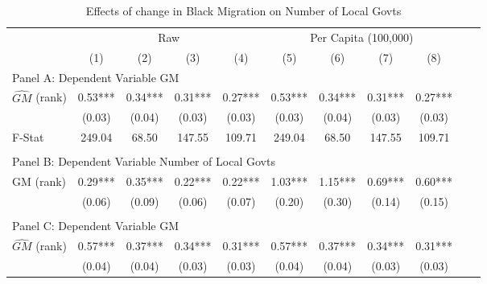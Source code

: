  \begin{table}[htbp]\centering {} \begin{threeparttable} \caption{Effects of change in Black Migration on Number of Local Govts} \begin{tabular}{l*{10}{c}} \toprule
                &\multicolumn{4}{c}{Raw}                                    &\multicolumn{4}{c}{Per Capita (100,000)}                   \\\cmidrule(lr){2-5}\cmidrule(lr){6-9}
                &\multicolumn{1}{c}{(1)}   &\multicolumn{1}{c}{(2)}   &\multicolumn{1}{c}{(3)}   &\multicolumn{1}{c}{(4)}   &\multicolumn{1}{c}{(5)}   &\multicolumn{1}{c}{(6)}   &\multicolumn{1}{c}{(7)}   &\multicolumn{1}{c}{(8)}   \\
\cmidrule(lr){1-9}
\multicolumn{8}{l}{Panel A: Dependent Variable GM}\\
\cmidrule(lr){1-9}
$\hat{GM}$ (rank)&       0.53***&       0.34***&       0.31***&       0.27***&       0.53***&       0.34***&       0.31***&       0.27***\\
                &     (0.03)   &     (0.04)   &     (0.03)   &     (0.03)   &     (0.03)   &     (0.04)   &     (0.03)   &     (0.03)   \\
\midrule
F-Stat          &     249.04   &      68.50   &     147.55   &     109.71   &     249.04   &      68.50   &     147.55   &     109.71   \\
\cmidrule[\heavyrulewidth](lr){1-9} \\ \cmidrule[\heavyrulewidth](lr){1-9}
\multicolumn{8}{l}{Panel B: Dependent Variable Number of Local Govts}\\
\cmidrule(lr){1-9}
GM  (rank)      &       0.29***&       0.35***&       0.22***&       0.22***&       1.03***&       1.15***&       0.69***&       0.60***\\
                &     (0.06)   &     (0.09)   &     (0.06)   &     (0.07)   &     (0.20)   &     (0.30)   &     (0.14)   &     (0.15)   \\
\cmidrule[\heavyrulewidth](lr){1-9} \\ \cmidrule[\heavyrulewidth](lr){1-9}
\multicolumn{8}{l}{Panel C: Dependent Variable GM}\\
\cmidrule(lr){1-9}
$\hat{GM}$ (rank)&       0.57***&       0.37***&       0.34***&       0.31***&       0.57***&       0.37***&       0.34***&       0.31***\\
                &     (0.04)   &     (0.04)   &     (0.03)   &     (0.03)   &     (0.04)   &     (0.04)   &     (0.03)   &     (0.03)   \\

\end{tabular}
\end{threeparttable}
\end{table}
